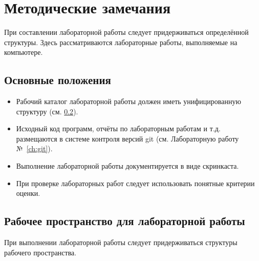 \chapter*{Методические замечания}

При составлении лабораторной работы следует придерживаться
определённой структуры. Здесь рассматриваются лабораторные работы,
выполняемые на компьютере.

\section{Основные положения}
\label{sec:method:general}

\begin{itemize}
\item Рабочий каталог лабораторной работы должен иметь унифицированную
  структуру (см. \ref{sec:method:work:lab}).
\item Исходный код программ, отчёты по лабораторным работам и
  т.д. размещаются в системе контроля версий git (см. Лабораторную
  работу №~\ref{ch:git}).
\item Выполнение лабораторной работы документируется в виде скринкаста.
\item При проверке лабораторных работ следует использовать понятные
  критерии оценки.
\end{itemize}

\section{Рабочее пространство для лабораторной работы}
\label{sec:method:work:lab}

При выполнении лабораторной работы следует придерживаться структуры рабочего пространства.

